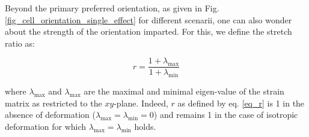 \documentclass[11pt]{amsart}
\begin{document}
Beyond the primary preferred orientation, as given in Fig. \ref{fig_cell_orientation_single_effect} for different scenarii, one can also wonder about the strength of the orientation imparted. For this, we define the stretch ratio as:

\begin{equation}
r=\frac{1+\lambda_{\text{max}}}{1+\lambda_{\text{min}}} \label{eq_r}
\end{equation} 

where $\lambda_{\text{max}}$ and $\lambda_{\text{max}}$ are the maximal and minimal eigen-value of the strain matrix as restricted to the $xy$-plane. Indeed, $r$ as defined by eq. \ref{eq_r} is 1 in the absence of deformation ($\lambda_{\text{max}}=\lambda_{\text{min}}=0$) and remains 1 in the case of isotropic deformation for which $\lambda_{\text{max}}=\lambda_{\text{min}}$ holds.

\begin{figure}
\end{figure}
\end{document}
